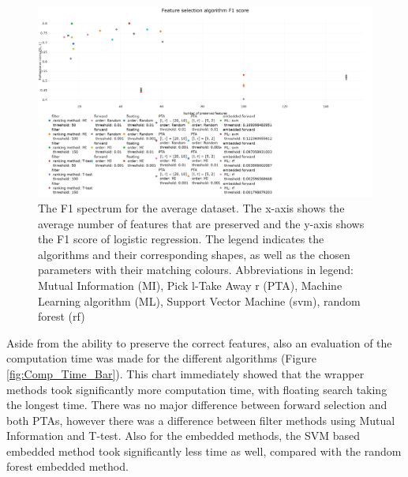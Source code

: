 \documentclass[10pt,a4paper]{report}
\begin{document}
	\begin{figure}[H]
		\centering
		\includegraphics[angle=90,height=1.4\textwidth]{F1_new.png}
		\caption{The F1 spectrum for the average dataset. The x-axis shows the average number of features that are preserved and the y-axis shows the F1 score of logistic regression. The legend indicates the algorithms and their corresponding shapes, as well as the chosen parameters with their matching colours. Abbreviations in legend: Mutual Information (MI), Pick l-Take Away r (PTA), Machine Learning algorithm (ML), Support Vector Machine (svm), random forest (rf)}
		\label{fig:Avg_F1_Spectrum}
	\end{figure}
	
	Aside from the ability to preserve the correct features, also an evaluation of the computation time was made for the different algorithms (Figure \ref{fig:Comp_Time_Bar}). This chart immediately showed that the wrapper methods took significantly more computation time, with floating search taking the longest time. There was no major difference between forward selection and both PTAs, however there was a difference between filter methods using Mutual Information and T-test. Also for the embedded methods, the SVM based embedded method took significantly less time as well, compared with the random forest embedded method.
	
\end{document}
